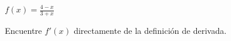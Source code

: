 \item $\displaystyle f(x) = \frac{4 - x}{3 + x}$
\par
Encuentre $f'(x)$ directamente de la definición de derivada.
